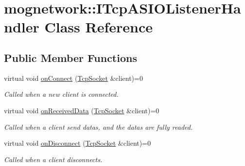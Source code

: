 \hypertarget{classmognetwork_1_1_i_tcp_a_s_i_o_listener_handler}{\section{mognetwork\-:\-:I\-Tcp\-A\-S\-I\-O\-Listener\-Handler Class Reference}
\label{classmognetwork_1_1_i_tcp_a_s_i_o_listener_handler}
}
\subsection*{Public Member Functions}
\begin{DoxyCompactItemize}
\item 
virtual void \hyperlink{classmognetwork_1_1_i_tcp_a_s_i_o_listener_handler_aa1d6b507fc5adc689698c6bd7f0a8ca0}{on\-Connect} (\hyperlink{classmognetwork_1_1_tcp_socket}{Tcp\-Socket} \&client)=0
\begin{DoxyCompactList}\small\item\em Called when a new client is connected. \end{DoxyCompactList}\item 
virtual void \hyperlink{classmognetwork_1_1_i_tcp_a_s_i_o_listener_handler_a8cc4a40b4addfc1abdf94ba66a545674}{on\-Received\-Data} (\hyperlink{classmognetwork_1_1_tcp_socket}{Tcp\-Socket} \&client)=0
\begin{DoxyCompactList}\small\item\em Called when a client send datas, and the datas are fully readed. \end{DoxyCompactList}\item 
virtual void \hyperlink{classmognetwork_1_1_i_tcp_a_s_i_o_listener_handler_afeb615cb2f1e1f543a6282e21e66c543}{on\-Disconnect} (\hyperlink{classmognetwork_1_1_tcp_socket}{Tcp\-Socket} \&client)=0
\begin{DoxyCompactList}\small\item\em Called when a client disconnects. \end{DoxyCompactList}\end{DoxyCompactItemize}


